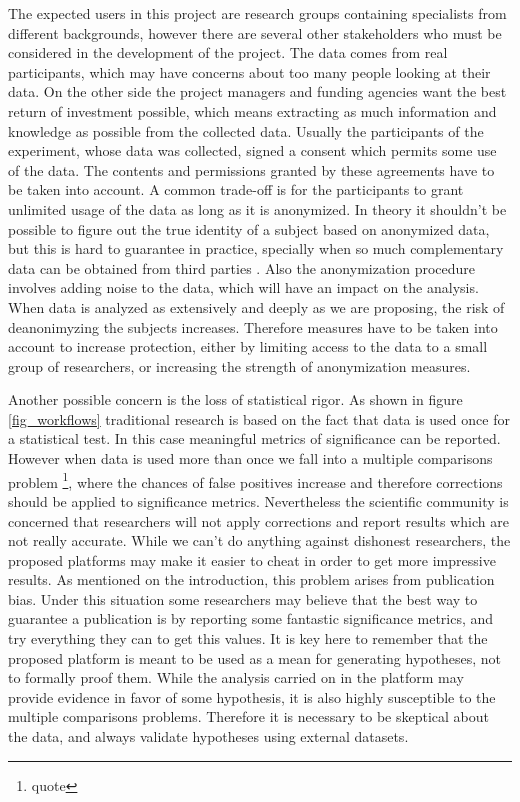 The expected users in this project are research groups containing specialists from different backgrounds, however there are several other stakeholders who must be considered in the development of the project. The data comes from real participants, which may have concerns about too many people looking at their data. On the other side the project managers and funding agencies want the best return of investment possible, which means extracting as much information and knowledge as possible from the collected data. Usually the participants of the experiment, whose data was collected, signed a consent which permits some use of the data. The contents and permissions granted by these agreements have to be taken into account. A common trade-off is for the participants to grant unlimited usage of the data as long as it is anonymized. In theory it shouldn't be possible to figure out the true identity of a subject based on anonymized data, but this is hard to guarantee in practice, specially when so much complementary data can be obtained from third parties \autocite{singel_netflix_2009}. Also the anonymization procedure involves adding noise to the data, which will have an impact on the analysis. When data is analyzed as extensively and deeply as we are proposing, the risk of deanonimyzing the subjects increases. Therefore measures have to be taken into account to increase protection, either by limiting access to the data to a small group of researchers, or increasing the strength of anonymization measures. 

Another possible concern is the loss of statistical rigor. As shown in figure \ref{fig_workflows} traditional research is based on the fact that data is used once for a statistical test. In this case meaningful metrics of significance can be reported. However when data is used more than once we fall into a multiple comparisons problem \footnote{quote}, where the chances of false positives increase and therefore corrections should be applied to significance metrics. Nevertheless the scientific community is concerned that researchers will not apply corrections and report results which are not really accurate. While we can't do anything against dishonest researchers, the proposed platforms may make it easier to cheat in order to get more impressive results. As mentioned on the introduction, this problem arises from publication bias. Under this situation some researchers may believe that the best way to guarantee a publication is by reporting some fantastic significance metrics, and try everything they can to get this values. It is key here to remember that the proposed platform is meant to be used as a mean for generating hypotheses, not to formally proof them. While the analysis carried on in the platform may provide evidence in favor of some hypothesis, it is also highly susceptible to the multiple comparisons problems. Therefore it is necessary to be skeptical about the data, and always validate hypotheses using external datasets.  

